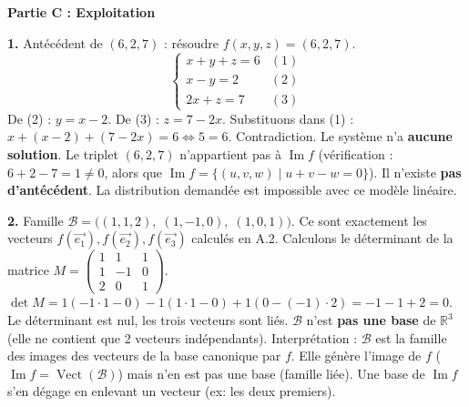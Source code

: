 \documentclass[11pt]{article}
\newcommand{\cle}[1]{{\popxbold\color{popdark}#1}}
\begin{document}
\begin{corrige}
\vspace{0.5em}
\textbf{Partie C : Exploitation}

\textbf{1.} Antécédent de $(6,2,7)$ : résoudre $f(x,y,z)=(6,2,7)$.
\[ \begin{cases} x + y + z = 6 & (1) \\ x - y = 2 & (2) \\ 2x + z = 7 & (3) \end{cases} \]
De (2) : $y = x-2$.
De (3) : $z = 7-2x$.
Substituons dans (1) : $x + (x-2) + (7-2x) = 6 \iff 5 = 6$.
\cle{Contradiction.} Le système n'a \textbf{aucune solution}.
Le triplet $(6,2,7)$ n'appartient pas à $\operatorname{Im} f$ (vérification : $6+2-7=1\neq0$, alors que $\operatorname{Im} f = \{(u,v,w)\mid u+v-w=0\}$).
Il n'existe \textbf{pas d'antécédent}. La distribution demandée est impossible avec ce modèle linéaire.

\textbf{2.} Famille $\mathcal{B}=\big((1,1,2),\;(1,-1,0),\;(1,0,1)\big)$.
Ce sont exactement les vecteurs $f(\vec{e_1}), f(\vec{e_2}), f(\vec{e_3})$ calculés en A.2.
Calculons le déterminant de la matrice $M = \begin{pmatrix} 1 & 1 & 1 \\ 1 & -1 & 0 \\ 2 & 0 & 1 \end{pmatrix}$.
$\det M = 1(-1\cdot1 - 0) - 1(1\cdot1 - 0) + 1(0 - (-1)\cdot2) = -1 - 1 + 2 = 0$.
Le déterminant est nul, les trois vecteurs sont \cle{liés}.
$\mathcal{B}$ n'est \textbf{pas une base} de $\mathbb{R}^3$ (elle ne contient que 2 vecteurs indépendants).
\cle{Interprétation :} $\mathcal{B}$ est la famille des images des vecteurs de la base canonique par $f$. Elle \cle{génère l'image} de $f$ ($\operatorname{Im} f = \operatorname{Vect}(\mathcal{B})$) mais n'en est pas une base (famille liée). Une base de $\operatorname{Im} f$ s'en dégage en enlevant un vecteur (ex: les deux premiers).


\end{corrige}
\end{document}
